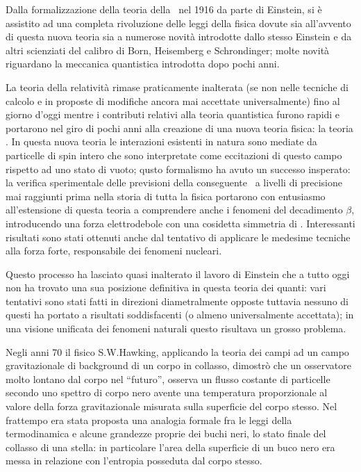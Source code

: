 Dalla formalizzazione della teoria della \ nel 1916 da parte di Einstein, si \`e assistito ad una completa rivoluzione delle leggi della fisica dovute sia all'avvento di questa nuova teoria sia a numerose  novit\`a introdotte dallo stesso Einstein e da altri scienziati del calibro di Born, Heisemberg e Schrondinger; molte novit\`a riguardano la {\vip meccanica quantistica} introdotta dopo pochi anni.
\par
La teoria della relativit\`a rimase praticamente inalterata (se non nelle tecniche di calcolo e in proposte di modifiche ancora mai accettate universalmente) fino al giorno d'oggi mentre i contributi relativi alla teoria quantistica furono rapidi e portarono nel giro di pochi anni alla creazione di una nuova teoria fisica: la teoria . In questa nuova teoria  le interazioni esistenti in natura sono mediate da particelle di spin intero che sono   interpretate  come eccitazioni di questo campo rispetto ad uno stato di vuoto; qusto formalismo ha avuto un successo insperato: la verifica sperimentale delle previsioni della conseguente \ a livelli di precisione  mai raggiunti prima  nella storia di tutta la fisica portarono con entusiasmo all'estensione di questa teoria a comprendere anche i fenomeni del decadimento $\beta$, introducendo una forza elettrodebole con una cosidetta simmetria di . Interessanti risultati sono stati  ottenuti anche dal tentativo di applicare le medesime tecniche alla forza forte, responsabile dei fenomeni nucleari.
\par
Questo processo ha lasciato quasi inalterato il lavoro di Einstein che a tutto oggi non ha trovato una sua posizione definitiva in questa teoria dei quanti: vari tentativi sono stati fatti in direzioni diametralmente opposte tuttavia nessuno di questi  ha  portato a risultati soddisfacenti (o almeno universalmente accettata); in una visione unificata dei fenomeni naturali questo risultava un grosso problema.
\par
Negli anni 70 il fisico S.W.Hawking, applicando la teoria dei campi ad un campo gravitazionale di background di un corpo in collasso, dimostr\`o che un osservatore molto lontano dal corpo nel ``futuro'', osserva un flusso costante di particelle secondo uno spettro di corpo nero avente una temperatura proporzionale al valore della forza gravitazionale misurata sulla superficie del corpo stesso. Nel frattempo era stata proposta una analogia formale fra le leggi della termodinamica e  alcune grandezze proprie dei buchi neri, lo stato finale del collasso di una stella: in particolare l'area della superficie di un buco nero era messa in relazione con l'entropia posseduta dal corpo stesso.

